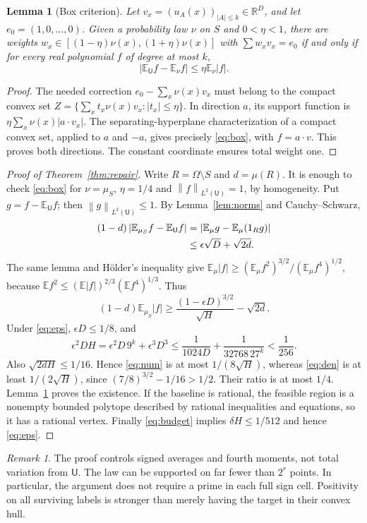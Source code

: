 \documentclass[11pt]{article}
\newtheorem{lemma}[theorem]{Lemma}
\theoremstyle{remark}\newtheorem{remark}[theorem]{Remark}
\newcommand{\E}{\mathbb E}
\newcommand{\U}{\mathsf U}
\newcommand{\R}{\mathbb R}
\newcommand{\abs}[1]{\left|#1\right|}
\newcommand{\norm}[1]{\left\|#1\right\|}
\begin{document}
\begin{lemma}[Box criterion]\label{lem:box}
Let $v_x=(u_A(x))_{|A|\le k}\in\R^D$, and let $e_0=(1,0,\ldots,0)$. Given a probability law $\nu$ on $S$ and $0<\eta<1$, there are weights $w_x\in[(1-\eta)\nu(x),(1+\eta)\nu(x)]$ with $\sum w_xv_x=e_0$ if and only if for every real polynomial $f$ of degree at most $k$,
\begin{equation}\label{eq:box}
 \abs{\E_\U f-\E_\nu f}\le\eta\E_\nu|f|.
\end{equation}
\end{lemma}
\begin{proof}
The needed correction $e_0-\sum_x\nu(x)v_x$ must belong to the compact convex set $Z=\{\sum_x t_x\nu(x)v_x:|t_x|\le\eta\}$. In direction $a$, its support function is $\eta\sum_x\nu(x)|a\cdot v_x|$. The separating-hyperplane characterization of a compact convex set, applied to $a$ and $-a$, gives precisely \eqref{eq:box}, with $f=a\cdot v$. This proves both directions. The constant coordinate ensures total weight one.
\end{proof}
\begin{proof}[Proof of Theorem~\ref{thm:repair}]
Write $R=\Omega\setminus S$ and $d=\mu(R)$. It is enough to check \eqref{eq:box} for $\nu=\mu_S$, $\eta=1/4$ and $\norm f_{L^2(\U)}=1$, by homogeneity. Put $g=f-\E_\U f$; then $\norm g_{L^2(\U)}\le1$. By Lemma~\ref{lem:norms} and Cauchy--Schwarz,
\begin{align}
 (1-d)\abs{\E_{\mu_S}f-\E_\U f}
 &=\abs{\E_\mu g-\E_\mu(1_R g)}\notag\\
 &\le\epsilon\sqrt D+\sqrt{2d}.\label{eq:num}
\end{align}
The same lemma and H\"older's inequality give $\E_\mu |f|\ge (\E_\mu f^2)^{3/2}/(\E_\mu f^4)^{1/2}$, because $\E f^2\le(\E|f|)^{2/3}(\E f^4)^{1/3}$. Thus
\begin{equation}\label{eq:den}
 (1-d)\E_{\mu_S}|f|\ge \frac{(1-\epsilon D)^{3/2}}{\sqrt H}-\sqrt{2d}.
\end{equation}
Under \eqref{eq:eps}, $\epsilon D\le1/8$, and
\[
 \epsilon^2 D H=\epsilon^2D\,9^k+\epsilon^3D^3
 \le \frac{1}{1024D}+\frac{1}{32768\,27^k}<\frac1{256}.
\]
Also $\sqrt{2dH}\le1/16$. Hence \eqref{eq:num} is at most $1/(8\sqrt H)$, whereas \eqref{eq:den} is at least $1/(2\sqrt H)$, since $(7/8)^{3/2}-1/16>1/2$. Their ratio is at most $1/4$. Lemma~\ref{lem:box} proves the existence. If the baseline is rational, the feasible region is a nonempty bounded polytope described by rational inequalities and equations, so it has a rational vertex. Finally \eqref{eq:budget} implies $\delta H\le1/512$ and hence \eqref{eq:eps}.
\end{proof}
\begin{remark}
The proof controls signed averages and fourth moments, not total variation from $\U$. The law can be supported on far fewer than $2^r$ points. In particular, the argument does not require a prime in each full sign cell. Positivity on all surviving labels is stronger than merely having the target in their convex hull.
\end{remark}
\end{document}
